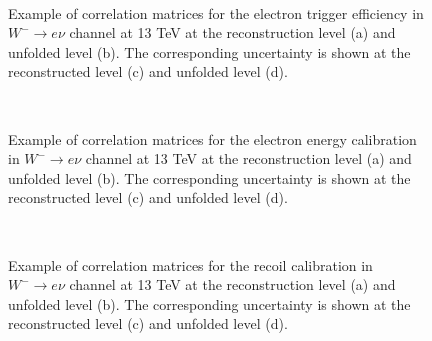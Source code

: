 \begin{figure}[h]
  \centering
   \\
  \caption{ Example of correlation matrices for the electron trigger efficiency in $W^{-}\rightarrow e\nu$ channel at 13 TeV at the reconstruction level (a) and unfolded level (b). The corresponding uncertainty is shown at the reconstructed level (c) and unfolded level (d).}
  \label{fig:ElTrig}
\end{figure}

\begin{figure}[h]
  \centering
   \\
  \caption{ Example of correlation matrices for the electron energy calibration in $W^{-}\rightarrow e\nu$ channel at 13 TeV at the reconstruction level (a) and unfolded level (b). The corresponding uncertainty is shown at the reconstructed level (c) and unfolded level (d).}
  \label{fig:ElCalib}
\end{figure}

\begin{figure}[h]
  \centering
   \\
  \caption{ Example of correlation matrices for the recoil calibration in $W^{-}\rightarrow e\nu$ channel at 13 TeV at the reconstruction level (a) and unfolded level (b). The corresponding uncertainty is shown at the reconstructed level (c) and unfolded level (d).}
  \label{fig:RecoilCalib}
\end{figure}

